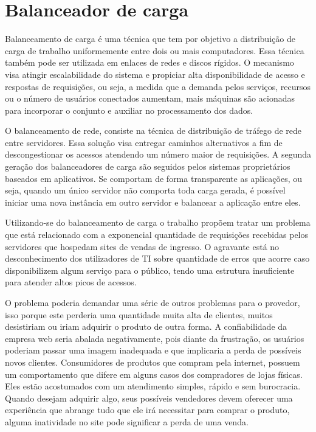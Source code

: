 \chapter{Balanceador de carga}

Balanceamento de carga é uma técnica que tem por objetivo a distribuição de carga de trabalho uniformemente entre dois ou
mais computadores. Essa técnica também pode ser utilizada em enlaces de redes e discos rígidos. O mecanismo visa atingir
escalabilidade do sistema e propiciar alta disponibilidade de acesso e respostas de requisições, ou seja, a medida que a
demanda pelos serviços, recursos ou o número de usuários conectados aumentam, mais máquinas são acionadas para incorporar
o conjunto e auxiliar no processamento dos dados.


O balanceamento de rede, consiste na técnica de distribuição de tráfego de rede entre servidores. Essa solução visa entregar
caminhos alternativos a fim de descongestionar os acessos atendendo um número maior de requisições. A segunda geração dos
balanceadores de carga são seguidos pelos sistemas proprietários baseados em aplicativos. Se comportam de forma transparente
as aplicações, ou seja, quando um único servidor não comporta toda carga gerada, é possível iniciar uma nova instância em
outro servidor e balancear a aplicação entre eles.


Utilizando-se do balanceamento de carga o trabalho propõem tratar um problema que está relacionado com a exponencial
quantidade de requisições recebidas pelos servidores que hospedam sites de vendas de ingresso. O agravante está no
desconhecimento dos utilizadores de TI sobre quantidade de erros que acorre caso disponibilizem algum serviço para o
público, tendo uma estrutura insuficiente para atender altos picos de acessos.

O problema poderia demandar uma série de outros problemas para o provedor, isso porque este perderia uma quantidade muita
alta de clientes, muitos desistiriam ou iriam adquirir o produto de outra forma. A confiabilidade da empresa web seria
abalada negativamente, pois diante da frustração, os usuários poderiam passar uma imagem inadequada e que implicaria a perda
de possíveis novos clientes. Consumidores de produtos que compram pela internet, possuem um comportamento que difere em
alguns casos dos compradores de lojas físicas. Eles estão acostumados com um atendimento simples, rápido e sem burocracia.
Quando desejam adquirir algo, seus possíveis vendedores devem oferecer uma experiência que abrange tudo que ele irá
necessitar para comprar o produto, alguma inatividade no site pode significar a perda de uma venda.


